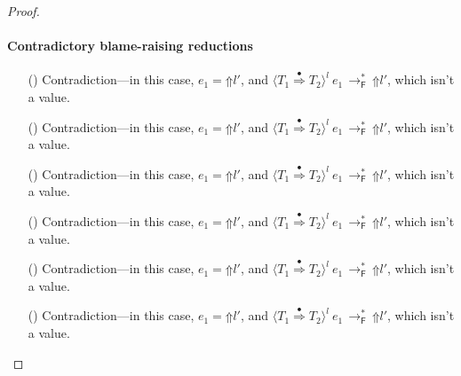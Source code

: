 \documentclass[9pt]{extarticle}
\newcommand{\ottnt}[1]{\mathit{#1}}
\newcommand{\ottsym}[1]{#1}
\begin{document}
{\begin{lemma}
\begin{proof}
{    \paragraph{Contradictory blame-raising reductions}
    \begin{itemize}
    \item[(\E{AppRaiseL})] Contradiction---in this case, $\ottnt{e_{{\mathrm{1}}}}  \ottsym{=}   \mathord{\Uparrow}  \ottnt{l'} $, and $ \langle  \ottnt{T_{{\mathrm{1}}}}  \mathord{ \overset{\bullet}{\Rightarrow} }  \ottnt{T_{{\mathrm{2}}}}  \rangle^{ \ottnt{l} } ~  \ottnt{e_{{\mathrm{1}}}}  \,  \longrightarrow ^{*}_{  \mathsf{F}  }  \,  \mathord{\Uparrow}  \ottnt{l'} $, which isn't
      a value.
    \item[(\E{AppRaiseR})] Contradiction---in this case, $\ottnt{e_{{\mathrm{1}}}}  \ottsym{=}   \mathord{\Uparrow}  \ottnt{l'} $, and $ \langle  \ottnt{T_{{\mathrm{1}}}}  \mathord{ \overset{\bullet}{\Rightarrow} }  \ottnt{T_{{\mathrm{2}}}}  \rangle^{ \ottnt{l} } ~  \ottnt{e_{{\mathrm{1}}}}  \,  \longrightarrow ^{*}_{  \mathsf{F}  }  \,  \mathord{\Uparrow}  \ottnt{l'} $, which isn't
      a value.
    \item[(\E{CastRaise})]  Contradiction---in this case, $\ottnt{e_{{\mathrm{1}}}}  \ottsym{=}   \mathord{\Uparrow}  \ottnt{l'} $, and $ \langle  \ottnt{T_{{\mathrm{1}}}}  \mathord{ \overset{\bullet}{\Rightarrow} }  \ottnt{T_{{\mathrm{2}}}}  \rangle^{ \ottnt{l} } ~  \ottnt{e_{{\mathrm{1}}}}  \,  \longrightarrow ^{*}_{  \mathsf{F}  }  \,  \mathord{\Uparrow}  \ottnt{l'} $, which isn't
      a value.
    \item[(\E{CheckFail})] Contradiction---in this case, $\ottnt{e_{{\mathrm{1}}}}  \ottsym{=}   \mathord{\Uparrow}  \ottnt{l'} $, and $ \langle  \ottnt{T_{{\mathrm{1}}}}  \mathord{ \overset{\bullet}{\Rightarrow} }  \ottnt{T_{{\mathrm{2}}}}  \rangle^{ \ottnt{l} } ~  \ottnt{e_{{\mathrm{1}}}}  \,  \longrightarrow ^{*}_{  \mathsf{F}  }  \,  \mathord{\Uparrow}  \ottnt{l'} $, which isn't
      a value.
    \item[(\E{OpRaise})] Contradiction---in this case, $\ottnt{e_{{\mathrm{1}}}}  \ottsym{=}   \mathord{\Uparrow}  \ottnt{l'} $, and $ \langle  \ottnt{T_{{\mathrm{1}}}}  \mathord{ \overset{\bullet}{\Rightarrow} }  \ottnt{T_{{\mathrm{2}}}}  \rangle^{ \ottnt{l} } ~  \ottnt{e_{{\mathrm{1}}}}  \,  \longrightarrow ^{*}_{  \mathsf{F}  }  \,  \mathord{\Uparrow}  \ottnt{l'} $, which isn't
      a value.
    \item[(\E{CheckRaise})] Contradiction---in this case, $\ottnt{e_{{\mathrm{1}}}}  \ottsym{=}   \mathord{\Uparrow}  \ottnt{l'} $, and $ \langle  \ottnt{T_{{\mathrm{1}}}}  \mathord{ \overset{\bullet}{\Rightarrow} }  \ottnt{T_{{\mathrm{2}}}}  \rangle^{ \ottnt{l} } ~  \ottnt{e_{{\mathrm{1}}}}  \,  \longrightarrow ^{*}_{  \mathsf{F}  }  \,  \mathord{\Uparrow}  \ottnt{l'} $, which isn't
      a value.
    \end{itemize}
    \else

}
\end{proof}
\end{lemma}}
\end{document}
